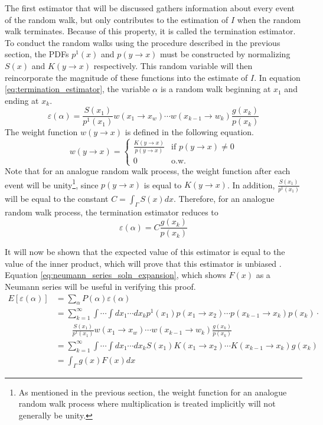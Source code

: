 The first estimator that will be discussed gathers information about every
event of the random walk, but only contributes to the estimation of $I$ when
the random walk terminates. Because of this property, it is called the
termination estimator. To conduct the random walks using the procedure
described in the previous section, the PDFs $p^1(x)$ and $p(y \to x)$ must be 
constructed by normalizing $S(x)$ and $K(y \to x)$ respectively. This random
variable will then reincorporate the magnitude of these functions into
the estimate of $I$. In equation \ref{eq:termination_estimator}, the variable 
$\alpha$ is a random walk beginning at $x_1$ and ending at $x_k$.
\begin{equation}
  \varepsilon(\alpha) = \frac{S(x_1)}{p^1(x_1)}w(x_1 \to x_w)\cdots 
  w(x_{k-1} \to w_k)\frac{g(x_k)}{p(x_k)}
  \label{eq:termination_estimator}
\end{equation}
The weight function $w(y \to x)$ is defined in the following equation.
\begin{equation}
  w(y \to x) = 
  \begin{cases}
    \frac{K(y \to x)}{p(y \to x)} & \text{if } p(y \to x) \neq 0 \\
    0 & \text{o.w.}
  \end{cases}
\end{equation}
Note that for an analogue random walk process, the weight function after each
event will be unity\footnote{As mentioned in the previous section, the weight
function for an analogue random walk process where multiplication is treated 
implicitly will not generally be unity.}, since $p(y \to x)$ is equal to 
$K(y \to x)$. In addition, $\frac{S(x_1)}{p^1(x_1)}$ will be equal to the 
constant $C = \int_{\Gamma} S(x)dx$. Therefore, for an analogue random walk 
process, the termination estimator reduces to
\begin{equation*}
  \varepsilon(\alpha) = C \frac{g(x_k)}{p(x_k)}
\end{equation*}

It will now be shown that the expected value of this estimator is equal to the 
value of the inner product, which will prove that this estimator is unbiased 
\citep{spanier_monte_1969}. Equation \ref{eq:neumann_series_soln_expansion},
which shows $F(x)$ as a Neumann series will be useful in verifying this proof.
\begin{align}
  E\left[\varepsilon(\alpha)\right] & = \sum_{\alpha} 
  P(\alpha)\varepsilon(\alpha) \nonumber \\
  & = \sum_{k=1}^{\infty} \int \cdots \int dx_1 \cdots dx_k p^1(x_1)
  p(x_1 \to x_2) \cdots p(x_{k-1} \to x_k)p(x_k) \cdot \nonumber \\
  & \qquad \frac{S(x_1)}{p^1(x_1)}w(x_1 \to x_w)\cdots 
  w(x_{k-1} \to w_k)\frac{g(x_k)}{p(x_k)} \nonumber \\
  & = \sum_{k=1}^{\infty} \int \cdots \int dx_1 \cdots dx_k S(x_1)K(x_1 \to x_2)
  \cdots K(x_{k-1} \to x_k)g(x_k) \nonumber \\
  & = \int_{\Gamma} g(x)F(x)dx \nonumber  
\end{align}

